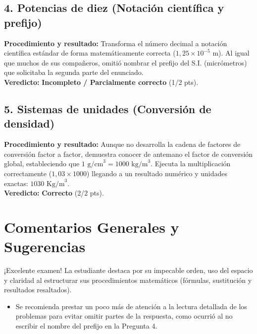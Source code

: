 \documentclass[12pt]{article}
\begin{document}
\subsection*{4. Potencias de diez (Notación científica y prefijo)}
\textbf{Procedimiento y resultado:} Transforma el número decimal a notación científica estándar de forma matemáticamente correcta ($1,25 \times 10^{-5}$ m). Al igual que muchos de sus compañeros, omitió nombrar el prefijo del S.I. (micrómetros) que solicitaba la segunda parte del enunciado. \\
\textbf{Veredicto:} \textbf{Incompleto / Parcialmente correcto} (1/2 pts).

\subsection*{5. Sistemas de unidades (Conversión de densidad)}
\textbf{Procedimiento y resultado:} Aunque no desarrolla la cadena de factores de conversión factor a factor, demuestra conocer de antemano el factor de conversión global, estableciendo que $1 \text{ g/cm}^3 = 1000 \text{ kg/m}^3$. Ejecuta la multiplicación correctamente ($1,03 \times 1000$) llegando a un resultado numérico y unidades exactas: $1030 \text{ Kg/m}^3$. \\
\textbf{Veredicto:} \textbf{Correcto} (2/2 pts).

\vspace{0.5cm}
\section*{Comentarios Generales y Sugerencias}
¡Excelente examen! La estudiante destaca por su impecable orden, uso del espacio y claridad al estructurar sus procedimientos matemáticos (fórmulas, sustitución y resultados resaltados).
\begin{itemize}
    \item Se recomienda prestar un poco más de atención a la lectura detallada de los problemas para evitar omitir partes de la respuesta, como ocurrió al no escribir el nombre del prefijo en la Pregunta 4.
\end{itemize}
\end{document}
